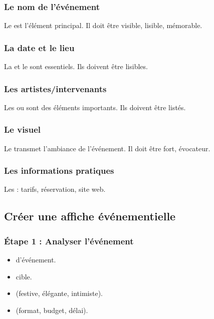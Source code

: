 \subsubsection{Le nom de l'événement}

Le  est l'élément principal. Il doit être visible, lisible, mémorable.

\subsubsection{La date et le lieu}

La  et le  sont essentiels. Ils doivent être lisibles.

\subsubsection{Les artistes/intervenants}

Les  ou  sont des éléments importants. Ils doivent être listés.

\subsubsection{Le visuel}

Le  transmet l'ambiance de l'événement. Il doit être fort, évocateur.

\subsubsection{Les informations pratiques}

Les  : tarifs, réservation, site web.

\subsection{Créer une affiche événementielle}

\subsubsection{Étape 1 : Analyser l'événement}

\begin{itemize}
    \item {} d'événement.
    \item {} cible.
    \item {} (festive, élégante, intimiste).
    \item {} (format, budget, délai).
\end{itemize}

